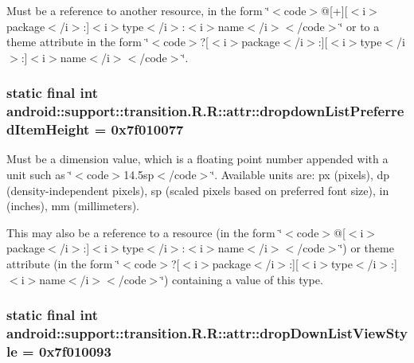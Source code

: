 Must be a reference to another resource, in the form \char`\"{}$<$code$>$@\mbox{[}+\mbox{]}\mbox{[}$<$i$>$package$<$/i$>$:\mbox{]}$<$i$>$type$<$/i$>$:$<$i$>$name$<$/i$>$$<$/code$>$\char`\"{} or to a theme attribute in the form \char`\"{}$<$code$>$?\mbox{[}$<$i$>$package$<$/i$>$:\mbox{]}\mbox{[}$<$i$>$type$<$/i$>$:\mbox{]}$<$i$>$name$<$/i$>$$<$/code$>$\char`\"{}. \hypertarget{classandroid_1_1support_1_1transition_1_1_r_1_1attr_f0f080152ab0053cb4011af8255ca699}{
\subsubsection[{dropdownListPreferredItemHeight}]{\setlength{\rightskip}{0pt plus 5cm}static final int android::support::transition.R.R::attr::dropdownListPreferredItemHeight = 0x7f010077}}
\label{classandroid_1_1support_1_1transition_1_1_r_1_1attr_f0f080152ab0053cb4011af8255ca699}


Must be a dimension value, which is a floating point number appended with a unit such as \char`\"{}$<$code$>$14.5sp$<$/code$>$\char`\"{}. Available units are: px (pixels), dp (density-independent pixels), sp (scaled pixels based on preferred font size), in (inches), mm (millimeters). 

This may also be a reference to a resource (in the form \char`\"{}$<$code$>$@\mbox{[}$<$i$>$package$<$/i$>$:\mbox{]}$<$i$>$type$<$/i$>$:$<$i$>$name$<$/i$>$$<$/code$>$\char`\"{}) or theme attribute (in the form \char`\"{}$<$code$>$?\mbox{[}$<$i$>$package$<$/i$>$:\mbox{]}\mbox{[}$<$i$>$type$<$/i$>$:\mbox{]}$<$i$>$name$<$/i$>$$<$/code$>$\char`\"{}) containing a value of this type. \hypertarget{classandroid_1_1support_1_1transition_1_1_r_1_1attr_d55fb67931921c64e52d62aec85c9223}{
\subsubsection[{dropDownListViewStyle}]{\setlength{\rightskip}{0pt plus 5cm}static final int android::support::transition.R.R::attr::dropDownListViewStyle = 0x7f010093}}
\label{classandroid_1_1support_1_1transition_1_1_r_1_1attr_d55fb67931921c64e52d62aec85c9223}


